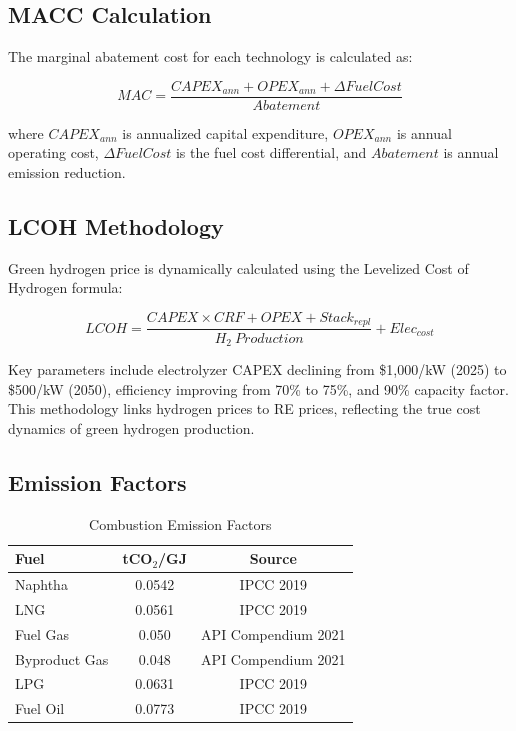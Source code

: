 \documentclass[12pt,a4paper]{article}
\begin{document}
\subsection{MACC Calculation}

The marginal abatement cost for each technology is calculated as:

\begin{equation}
MAC = \frac{CAPEX_{ann} + OPEX_{ann} + \Delta FuelCost}{Abatement}
\end{equation}

where $CAPEX_{ann}$ is annualized capital expenditure, $OPEX_{ann}$ is annual operating cost, $\Delta FuelCost$ is the fuel cost differential, and $Abatement$ is annual emission reduction.

\subsection{LCOH Methodology}

Green hydrogen price is dynamically calculated using the Levelized Cost of Hydrogen formula:

\begin{equation}
LCOH = \frac{CAPEX \times CRF + OPEX + Stack_{repl}}{H_2\ Production} + Elec_{cost}
\end{equation}

Key parameters include electrolyzer CAPEX declining from \$1,000/kW (2025) to \$500/kW (2050), efficiency improving from 70\% to 75\%, and 90\% capacity factor. This methodology links hydrogen prices to RE prices, reflecting the true cost dynamics of green hydrogen production.

\subsection{Emission Factors}

\begin{table}[H]
\centering
\caption{Combustion Emission Factors}
\begin{tabular}{lcc}
\toprule
Fuel & tCO$_2$/GJ & Source \\
\midrule
Naphtha & 0.0542 & IPCC 2019 \\
LNG & 0.0561 & IPCC 2019 \\
Fuel Gas & 0.050 & API Compendium 2021 \\
Byproduct Gas & 0.048 & API Compendium 2021 \\
LPG & 0.0631 & IPCC 2019 \\
Fuel Oil & 0.0773 & IPCC 2019 \\
\bottomrule
\end{tabular}
\end{table}
\end{document}
